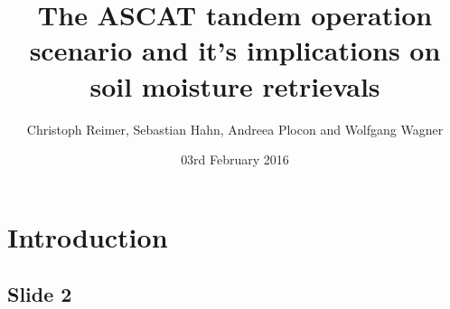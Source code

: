 \documentclass[10pt,ignorenonframetext,xcolor={dvipsnames, table}]{beamer}
\title{The ASCAT tandem operation scenario and it's implications on soil
moisture retrievals}
\author{Christoph Reimer\inst{1}, Sebastian Hahn\inst{1}, Andreea Plocon\inst{1}
and Wolfgang Wagner\inst{1}}
\institute{\inst{1}TU Wien}
\date{03rd February 2016}
\begin{document}
\begin{frame}[plain]
\titlepage
\end{frame}


\section{Introduction}\label{introduction}

\subsection{Slide 2}\label{slide-2}
\end{document}
